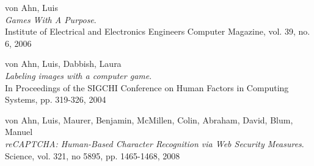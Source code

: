 \begin{thebibliography}{99}
  {\sc von Ahn,} Luis\\
  \emph{Games With A Purpose}.\\
  Institute of Electrical and Electronics Engineers Computer Magazine, vol. 39, no. 6, 2006

  {\sc von Ahn,} Luis, {\sc Dabbish,} Laura\\
  \emph{Labeling images with a computer game}.\\
  In Proceedings of the SIGCHI Conference on Human Factors in Computing Systems, pp. 319-326, 2004
 
  {\sc von Ahn,} Luis, {\sc Maurer,} Benjamin, {\sc McMillen,} Colin, {\sc Abraham,} David, {\sc Blum,} Manuel\\
  \emph{reCAPTCHA: Human-Based Character Recognition via Web Security Measures}.\\
  Science, vol. 321, no 5895, pp. 1465-1468, 2008
 
\end{thebibliography}
